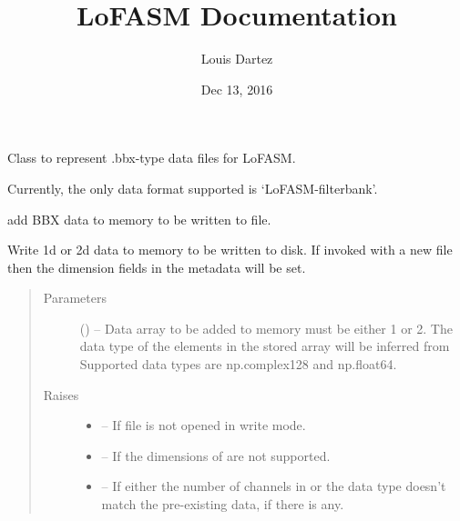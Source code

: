 \documentclass[letterpaper,10pt,english]{sphinxmanual}
\title{LoFASM Documentation}
\date{Dec 13, 2016}
\author{Louis Dartez}
\begin{document}
\maketitle
\sphinxtableofcontents
{}\label{index::doc}


\begin{fulllineitems}
\label{index:lofasm.bbx.bbx.LofasmFile}
Class to represent .bbx-type data files for LoFASM.

Currently, the only data format supported is `LoFASM-filterbank'.

\begin{fulllineitems}
\label{index:lofasm.bbx.bbx.LofasmFile.add_data}
add BBX data to memory to be written to file.

Write 1d or 2d data to memory to be written to disk.
If invoked with a new file then the dimension fields in the
metadata will be set.
\begin{quote}\begin{description}
\item[{Parameters}] \leavevmode
{} () -- Data array to be added to memory
 must be either 1 or 2.
The data type of the elements in the stored array will be
inferred from 
Supported data types are np.complex128 and np.float64.

\item[{Raises}] \leavevmode\begin{itemize}
\item {} 
 -- If file is not opened in write mode.

\item {} 
 -- If the dimensions of  are not supported.

\item {} 
 -- If either the number of channels in  or the data type doesn't match the pre-existing data, if there is
any.

\end{itemize}


\end{description}
\end{quote}
\end{fulllineitems}
\end{fulllineitems}
\end{document}
